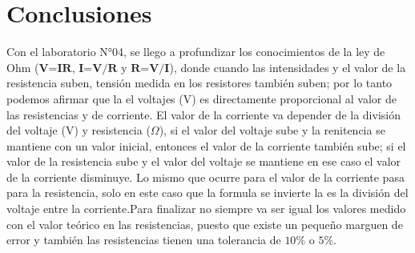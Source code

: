 \section{Conclusiones}
Con el laboratorio N°04, se llego a profundizar los conocimientos de la ley de Ohm ($\textbf{V=IR}$, $\textbf{I=V/R}$ y $\textbf{R=V/I}$), donde cuando las intensidades  y el valor de la resistencia suben, tensión medida en los resistores también suben; por lo tanto podemos afirmar que la el voltajes (V) es directamente proporcional al valor de las resistencias y de corriente. El valor de la corriente va depender de la división del voltaje (V) y resistencia ($\Omega$), si el valor del voltaje sube y la renitencia se mantiene con un valor inicial, entonces el valor de la corriente también sube; si el valor de la resistencia sube y el valor del voltaje se mantiene en ese caso el valor de la corriente disminuye. Lo mismo que ocurre para el valor de la corriente pasa para la resistencia, solo en este caso que la formula se invierte la es la división del voltaje entre la corriente.Para finalizar no siempre va ser igual los valores medido con el valor teórico  en las resistencias, puesto que existe un pequeño marguen de error y también las resistencias tienen una tolerancia de $10\%$ o $ 5\%$.
